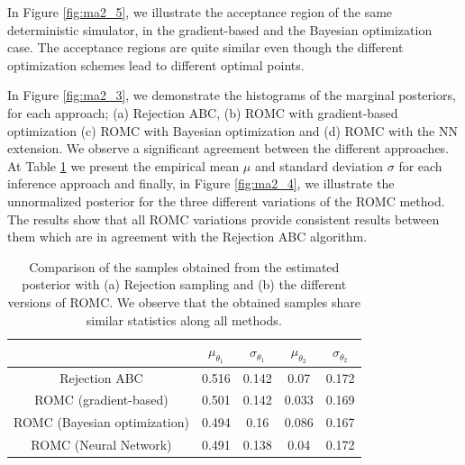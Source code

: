 \documentclass[article]{jss}
\begin{document}
In Figure \ref{fig:ma2_5}, we illustrate the acceptance region of the
same deterministic simulator, in the gradient-based and the Bayesian
optimization case. The acceptance regions are quite similar even though the
different optimization schemes lead to different optimal points.

In Figure \ref{fig:ma2_3}, we demonstrate the histograms of the
marginal posteriors, for each approach; (a) Rejection ABC, (b) ROMC
with gradient-based optimization (c) ROMC with Bayesian optimization
and (d) ROMC with the NN extension. We observe a significant agreement
between the different approaches. At Table \ref{tab:ma2} we present
the empirical mean \(\mu\) and standard deviation \(\sigma\) for each
inference approach and finally, in Figure \ref{fig:ma2_4}, we
illustrate the unnormalized posterior for the three different
variations of the ROMC method. The results show that all ROMC
variations provide consistent results between them which are in
agreement with the Rejection ABC algorithm.

\begin{table}
\begin{center}
\begin{tabular}{ c|c|c|c|c }
\hline
& \(\mu_{\theta_1}\) & \(\sigma_{\theta_1}\) & \(\mu_{\theta_2}\) & \(\sigma_{\theta_2}\) \\
\hline \hline
Rejection ABC & 0.516 & 0.142 & 0.07 & 0.172 \\
\hline
ROMC (gradient-based) & 0.501 & 0.142 & 0.033 & 0.169 \\
\hline
ROMC (Bayesian optimization) & 0.494 & 0.16 & 0.086 & 0.167 \\
\hline
ROMC (Neural Network) & 0.491 & 0.138 & 0.04 & 0.172 \\
\hline
\end{tabular}
\end{center}
\caption{Comparison of the samples obtained from the estimated
  posterior with (a) Rejection sampling and (b) the different versions
  of ROMC. We observe that the obtained samples share similar
  statistics along all methods. \label{tab:ma2}}
\end{table}
\end{document}
